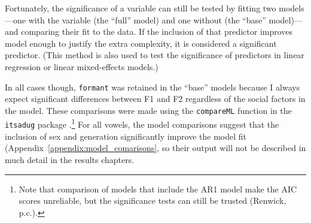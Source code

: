 Fortunately, the significance of a variable can still be tested by fitting two models---one with the variable (the ``full'' model) and one without (the ``base'' model)---and comparing their fit to the data. If the inclusion of that predictor improves model enough to justify the extra complexity, it is considered a significant predictor. (This method is also used to test the significance of predictors in linear regression or linear mixed-effects models.)

In all cases though, \texttt{formant} was retained in the ``base'' models because I always expect significant differences between F1 and F2 regardless of the social factors in the model. These comparisons were made using the \texttt{compareML} function in the \texttt{itsadug} package \citep{van_rij_etal_2017_itsadug}.\footnote{Note that comparison of models that include the AR1 model make the AIC scores unreliable, but the significance tests can still be trusted (Renwick, p.c.). } For all vowels, the model comparisons suggest that the inclusion of sex and generation significantly improve the model fit (Appendix~\ref{appendix:model_comarisons}, so their output will not be described in much detail in the results chapters.



